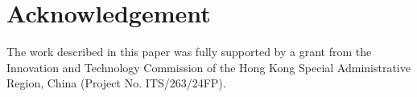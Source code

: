 \documentclass[letterpaper]{article} %
\begin{document}
\section*{Acknowledgement}
The work described in this paper was fully supported by a grant from the Innovation and Technology Commission of the Hong Kong Special Administrative Region, China (Project No. ITS/263/24FP).




% 



\cleardoublepage
\appendix

\onecolumn



\end{document}
